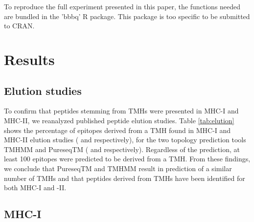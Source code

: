 
To reproduce the full experiment presented in this paper,
the functions needed are bundled in the 'bbbq' R package.
This package is too specific to be submitted to CRAN.

\section{Results}

\subsection{Elution studies}



To confirm that peptides stemming from TMHs were presented in MHC-I and MHC-II,
we reanalyzed published peptide elution studies.
Table \ref{tab:elution} shows the percentage of epitopes derived 
from a TMH
found in MHC-I and MHC-II elution 
studies (\cite{schellens2015comprehensive} and \cite{bergseng2015different} respectively), 
for the two topology prediction tools TMHMM and 
PureseqTM (\cite{krogh2001predicting} and \cite{wang2019efficient} respectively). 
Regardless of the prediction, 
at least 100 epitopes were predicted to be derived from a TMH. 
From these findings, we conclude that PureseqTM and TMHMM 
result in prediction of a similar number of TMHs 
and that peptides derived from TMHs have been identified for both MHC-I and -II.

\subsection{MHC-I}

